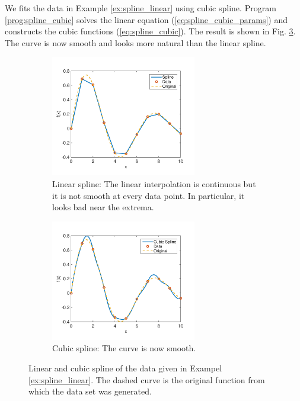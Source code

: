 \begin{example}
We fits the data in Example \ref{ex:spline_linear} using cubic spline.  Program \ref{prog:spline_cubic}  solves the linear equation (\ref{eq:spline_cubic_params}) and constructs the cubic functions (\ref{eq:spline_cubic}).  The result is shown in Fig. \ref{fig:spline_cubic}.  The curve is now smooth and looks more natural than the linear spline.

\begin{figure}
	\centering
	\begin{subfigure}{0.45\textwidth}
		\centering
		\includegraphics[width=2.5in]{12.fitting/spline_linear.pdf}
		\caption{Linear spline:  The linear interpolation is continuous but it is not smooth at every data point.  In particular, it looks bad near the extrema.}
		\label{fig:spline_linear}
	\end{subfigure}
	\begin{subfigure}{0.45\textwidth}
		\centering
		\includegraphics[width=2.5in]{12.fitting/spline_cubic.pdf}
		\caption{Cubic spline: The curve is now smooth.}
		\label{fig:spline_cubic}
	\end{subfigure}
\caption{Linear and cubic spline of the data given in Exampel \ref{ex:spline_linear}. The dashed curve is the original function from which the data set was generated.}
\end{figure}

\end{example}

